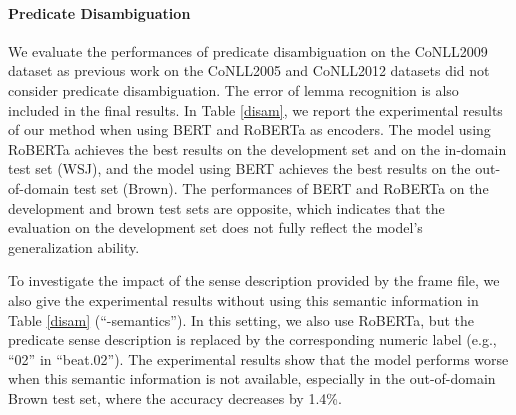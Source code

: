 \documentclass[11pt]{article}
\begin{document}
\paragraph{Predicate Disambiguation}
We evaluate the performances of predicate disambiguation on the CoNLL2009 dataset as previous work on the CoNLL2005 and CoNLL2012 datasets did not consider predicate disambiguation. The error of lemma recognition is also included in the final results. 
In Table \ref{disam}, we report the experimental results of our method when using BERT and RoBERTa as encoders. The model using RoBERTa achieves the best results on the development set and on the in-domain test set (WSJ), and the model using BERT achieves the best results on the out-of-domain test set (Brown). The performances of BERT and RoBERTa on the development and brown test sets are opposite,  which indicates that the evaluation on the development set does not fully reflect the model's generalization ability.
\par
To investigate the impact of the sense description provided by the frame file, we also give the experimental results without using this semantic information in Table \ref{disam} (``-semantics''). In this setting, we also use RoBERTa, but the predicate sense description is replaced by the corresponding numeric label (e.g., ``02'' in ``beat.02''). 
The experimental results show that the model performs worse when this semantic information is not available, especially in the out-of-domain Brown test set, where the accuracy decreases by 1.4\%. 
\end{document}
